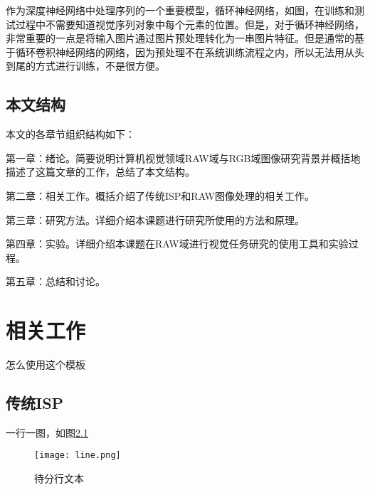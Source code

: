 \documentclass[winfonts]{njuthesis}
\begin{document}
作为深度神经网络中处理序列的一个重要模型，循环神经网络，如图，在训练和测试过程中不需要知道视觉序列对象中每个元素的位置。但是，对于循环神经网络，非常重要的一点是将输入图片通过图片预处理转化为一串图片特征\cite{graves2009novel,su2014accurate}。但是通常的基于循环卷积神经网络的网络，因为预处理不在系统训练流程之内，所以无法用从头到尾的方式进行训练，不是很方便。

%
%
%

\section{本文结构}
本文的各章节组织结构如下：

第一章：绪论。简要说明计算机视觉领域RAW域与RGB域图像研究背景并概括地描述了这篇文章的工作，总结了本文结构。

第二章：相关工作。概括介绍了传统ISP和RAW图像处理的相关工作。

第三章：研究方法。详细介绍本课题进行研究所使用的方法和原理。

第四章：实验。详细介绍本课题在RAW域进行视觉任务研究的使用工具和实验过程。

第五章：总结和讨论。

\chapter{相关工作}\label{chapter_system}

怎么使用这个模板

\section{传统ISP}

一行一图，如图\ref{fig:line}
\begin{figure}[htbp]
   \centering
   \texttt{[image: line.png]} %
   \caption{待分行文本}
   \label{fig:line}
\end{figure}
\end{document}
